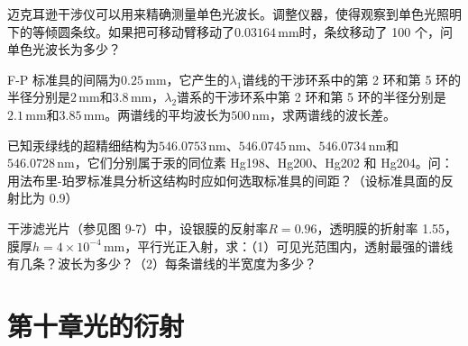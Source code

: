 \documentclass[standard, analysis, notocnum]{ExBook}
\newcommand{\answerarea}[1][8cm]{%
  \par\vspace{2mm}%
  \noindent{\color{themeColor!35}\rule{\linewidth}{0.4pt}}\par
  \noindent\begin{minipage}[t][#1][t]{\linewidth}\vspace{0pt}\end{minipage}\par
  \noindent{\color{themeColor!35}\rule{\linewidth}{0.4pt}}\par
}
\begin{document}
\begin{qitems}[startnum=8]
\qitem 迈克耳逊干涉仪可以用来精确测量单色光波长。调整仪器，使得观察到单色光照明下的等倾圆条纹。如果把可移动臂移动了$0.03164\,\mathrm{mm}$时，条纹移动了 100 个，问单色光波长为多少？
\label{q:214:start}
\answerarea[8cm]
\label{q:214:end}
\end{qitems}

\begin{qitems}[startnum=9]
\qitem F-P 标准具的间隔为$0.25\,\mathrm{mm}$，它产生的$\lambda_{1}$谱线的干涉环系中的第 2 环和第 5 环的半径分别是$2\,\mathrm{mm}$和$3.8\,\mathrm{mm}$，$\lambda_{2}$谱系的干涉环系中第 2 环和第 5 环的半径分别是$2.1\,\mathrm{mm}$和$3.85\,\mathrm{mm}$。两谱线的平均波长为$500\,\mathrm{nm}$，求两谱线的波长差。
\label{q:215:start}
\answerarea[8cm]
\label{q:215:end}
\end{qitems}

\begin{qitems}[startnum=10]
\qitem 已知汞绿线的超精细结构为$546.0753\,\mathrm{nm}$、$546.0745\,\mathrm{nm}$、$546.0734\,\mathrm{nm}$和$546.0728\,\mathrm{nm}$，它们分别属于汞的同位素 Hg198、Hg200、Hg202 和 Hg204。问：用法布里-珀罗标准具分析这结构时应如何选取标准具的间距？（设标准具面的反射比为 0.9）
\label{q:216:start}
\answerarea[8cm]
\label{q:216:end}
\end{qitems}

\begin{qitems}[startnum=11]
\qitem 干涉滤光片（参见图 9-7）中，设银膜的反射率$R=0.96$，透明膜的折射率 1.55，膜厚$h=4\times 10^{-4}\,\mathrm{mm}$，平行光正入射，求：（1）可见光范围内，透射最强的谱线有几条？波长为多少？（2）每条谱线的半宽度为多少？
\label{q:217:start}
\answerarea[8cm]
\label{q:217:end}
\end{qitems}

\section{第十章\quad 光的衍射}
\end{document}
